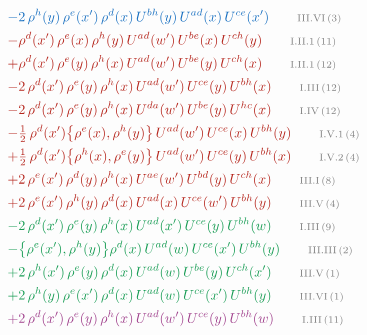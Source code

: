 \documentclass[10pt]{article}
\begin{document}
\begin{align}
&\qquad{\color{RoyalBlue}-2\,\rho^{h}(y)\,\rho^{e}(x')\,\rho^{d}(x)\,U^{bh}(y)\,U^{ad}(x)\,U^{ce}(x')}\tag*{\color{gray}\scriptsize III.VI\,(3)}\\
&\qquad{\color{BrickRed}-\rho^{d}(x')\,\rho^{e}(x)\,\rho^{h}(y)\,U^{ad}(w')\,U^{be}(x)\,U^{ch}(y)}\tag*{\color{gray}\scriptsize I.II.1\,(11)}\\
&\qquad{\color{BrickRed}+\rho^{d}(x')\,\rho^{e}(y)\,\rho^{h}(x)\,U^{ad}(w')\,U^{be}(y)\,U^{ch}(x)}\tag*{\color{gray}\scriptsize I.II.1\,(12)}\\
&\qquad{\color{BrickRed}-2\,\rho^{d}(x')\,\rho^{e}(y)\,\rho^{h}(x)\,U^{ad}(w')\,U^{ce}(y)\,U^{bh}(x)}\tag*{\color{gray}\scriptsize I.III\,(12)}\\
&\qquad{\color{BrickRed}-2\,\rho^{d}(x')\,\rho^{e}(y)\,\rho^{h}(x)\, U^{da}(w')\,U^{be}(y)\,U^{hc}(x)}\tag*{\color{gray}\scriptsize I.IV\,(12)}\\
&\qquad{\color{BrickRed}-\tfrac{1}{2}\,\rho^{d}(x')\big\{\rho^{e}(x),\rho^{h}(y)\big\}\,U^{ad}(w')\,U^{ce}(x)\,U^{bh}(y)}\tag*{\color{gray}\scriptsize I.V.1\,(4)}\\
&\qquad{\color{BrickRed}+\tfrac{1}{2}\,\rho^{d}(x')\big\{\rho^{h}(x),\rho^{e}(y)\big\}\,U^{ad}(w')\,U^{ce}(y)\,U^{bh}(x)}\tag*{\color{gray}\scriptsize I.V.2\,(4)}\\
&\qquad{\color{BrickRed}+2\,\rho^{e}(x')\,\rho^{d}(y)\, \rho^{h}(x)\, U^{ae}(w')\,U^{bd}(y)\,U^{ch}(x)}\tag*{\color{gray}\scriptsize III.I\,(8)}\\
&\qquad{\color{BrickRed}+2\,\rho^{e}(x')\,\rho^{h}(y)\,\rho^{d}(x)\,U^{ad}(x)\,U^{ce}(w')\,U^{bh}(y)}\tag*{\color{gray}\scriptsize III.V\,(4)}\\
&\qquad{\color{ForestGreen}-2\,\rho^{d}(x')\,\rho^{e}(y)\,\rho^{h}(x)\,U^{ad}(x')\,U^{ce}(y)\,U^{bh}(w)}\tag*{\color{gray}\scriptsize I.III\,(9)}\\
&\qquad{\color{ForestGreen}-\big\{\rho^{e}(x'),\rho^{h}(y)\big\}\rho^{d}(x)\,U^{ad}(w)\,U^{ce}(x')\,U^{bh}(y)}\tag*{\color{gray}\scriptsize III.III\,(2)}\\
&\qquad{\color{ForestGreen}+2\,\rho^{h}(x')\,\rho^{e}(y)\,\rho^{d}(x)\,U^{ad}(w)\,U^{be}(y)\,U^{ch}(x')}\tag*{\color{gray}\scriptsize III.V\,(1)}\\
&\qquad{\color{ForestGreen}+2\,\rho^{h}(y)\,\rho^{e}(x')\,\rho^{d}(x)\,U^{ad}(w)\,U^{ce}(x')\,U^{bh}(y)}\tag*{\color{gray}\scriptsize III.VI\,(1)}\\
&\qquad{\color{DarkOrchid}+2\,\rho^{d}(x')\,\rho^{e}(y)\,\rho^{h}(x)\,U^{ad}(w')\,U^{ce}(y)\,U^{bh}(w)}\tag*{\color{gray}\scriptsize I.III\,(11)}\\

\end{align}
\end{document}
